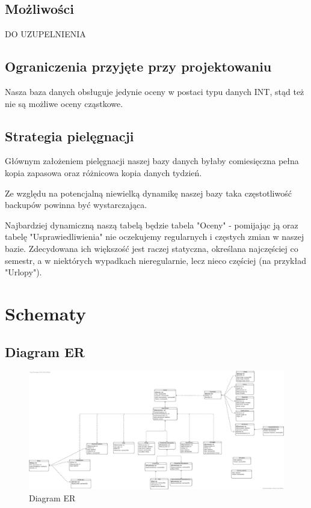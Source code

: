 \documentclass[60pt]{article}
\begin{document}
\subsection{Możliwości}

DO UZUPELNIENIA

\subsection{Ograniczenia przyjęte przy projektowaniu}

Nasza baza danych obsługuje jedynie oceny w postaci typu danych INT, stąd też nie są możliwe oceny cząstkowe. 

\subsection{Strategia pielęgnacji}

Głównym założeniem pielęgnacji naszej bazy danych byłaby comiesięczna pełna kopia zapasowa oraz różnicowa kopia danych tydzień. 

Ze względu na potencjalną niewielką dynamikę naszej bazy taka częstotliwość backupów powinna być wystarczająca. 

Najbardziej dynamiczną naszą tabelą będzie tabela "Oceny" - pomijając ją oraz tabelę "Usprawiedliwienia" nie oczekujemy regularnych i częstych zmian w naszej bazie. Zdecydowana ich większość jest raczej statyczna, określana najczęściej co semestr, a w niektórych wypadkach nieregularnie, lecz nieco częściej (na przykład "Urlopy").

\newpage
\section{Schematy}

\subsection{Diagram ER}

\begin{figure}
  \includegraphics[width=\linewidth]{diagram_ER.png}
  \caption{Diagram ER}
  \label{Diagram ER}
\end{figure}
\end{document}
